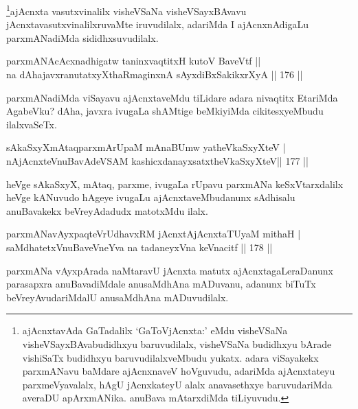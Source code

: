 \begin{artha}
\footnote{ajAcnxtavAda GaTadalilx `GaToVjAcnxta:' eMdu visheVSaNa visheVSayxBAvabudidhxyu baruvudilalx, visheVSaNa budidhxyu bArade vishiSaTx budidhxyu baruvudilalxveMbudu yukatx. adara viSayakekx parxmANavu baMdare ajAcnxnaveV hoVguvudu, adariMda ajAcnxtateyu parxmeVyavalalx, hAgU jAcnxkateyU alalx anavasethxye baruvudariMda averaDU apArxmANika. anuBava mAtarxdiMda tiLiyuvudu.}ajAcnxta vasutxvinalilx visheVSaNa visheVSayxBAvavu jAcnxtavasutxvinalilxruvaMte iruvudilalx, adariMda I ajAcnxnAdigaLu parxmANadiMda sididhxsuvudilalx.
\end{artha}


\begin{shl}
parxmANAcAcxnadhigatw taninxvaqtitxH kutoV BaveVtf ||  \\
na dAhajavxranutatxyXthaRmaginxnA sAyxdiBxSakikxrXyA \hfill||  176 ||  
\end{shl}

\begin{artha}
parxmANadiMda viSayavu ajAcnxtaveMdu tiLidare adara nivaqtitx EtariMda AgabeVku? dAha, javxra ivugaLa shAMtige beMkiyiMda cikitesxyeMbudu ilalxvaSeTx.
\end{artha}

\begin{shl}
sAkaSxyXmAtaqparxmArUpaM mAnaBUmw yatheVkaSxyXteV | \\
nAjAcnxteV\s nuBavAdeVSAM kashicxdanayxsatxtheVkaSxyXteV\hfill ||  177 ||  
\end{shl}

\begin{artha}
heVge sAkaSxyX, mAtaq, parxme, ivugaLa rUpavu parxmANa keSxVtarxdalilx heVge kANuvudo hAgeye ivugaLu ajAcnxtaveMbudanunx sAdhisalu anuBavakekx beVreyAdadudx matotxMdu ilalx.
\end{artha}

\begin{shl}
parxmANavAyxpaqteVrUdhavxRM jAcnxtAjAcnxtaTUyaM mithaH | \\
saMdhatetxV\s nuBaveVneYva na tadaneyxVna keVnacitf \hfill||  178 ||  
\end{shl}

\begin{artha}
parxmANa vAyxpArada naMtaravU jAcnxta matutx ajAcnxtagaLeraDanunx parasapxra anuBavadiMdale anusaMdhAna mADuvanu, adanunx biTuTx beVreyAvudariMdalU anusaMdhAna mADuvudilalx.
\end{artha}

